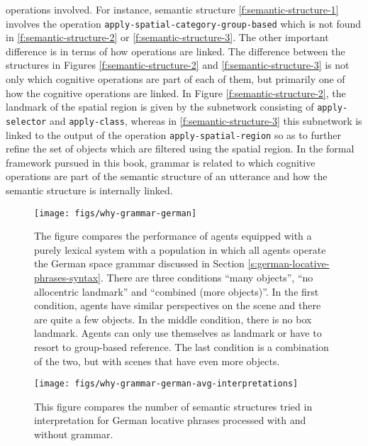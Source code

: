 operations involved. For instance, semantic structure \ref{f:semantic-structure-1}
involves the operation {\footnotesize\tt apply-spatial-category-group-based} 
which is not found in
\ref{f:semantic-structure-2} or \ref{f:semantic-structure-3}. The other 
important difference is in terms of how operations are linked. The 
difference between the structures in Figures \ref{f:semantic-structure-2}
and \ref{f:semantic-structure-3} is not only which cognitive operations 
are part of each of them, but primarily one of how the cognitive 
operations are linked. In Figure \ref{f:semantic-structure-2},
the landmark of the spatial region is given by the subnetwork consisting 
of {\footnotesize\tt apply-selector} and {\footnotesize\tt apply-class}, whereas in 
\ref{f:semantic-structure-3} this subnetwork is linked to the output of
the operation {\footnotesize\tt apply-spatial-region} so as to further refine the 
set of objects which are filtered using the spatial region. In the formal 
framework pursued in this book, grammar is related to which cognitive 
operations are part of the semantic structure of an 
utterance and how the semantic structure is internally linked.

\begin{figure}
\texttt{[image: figs/why-grammar-german]}
\caption[German locative phrases with and without grammar]{%
The figure compares
the performance of agents equipped with a purely 
lexical system with a population in 
which all agents operate the German space 
grammar discussed in Section 
\ref{s:german-locative-phrases-syntax}.
There are three conditions ``many objects'', 
``no allocentric landmark'' and 
``combined (more objects)''. In the first 
condition, agents have similar perspectives on the scene 
and there are quite a few objects. In the middle condition, there 
is no box landmark. Agents can only use 
themselves as landmark or have to resort to group-based 
reference. The last condition is a combination
of the two, but with scenes that have even more objects.}
\label{f:why-grammar-german}
\end{figure}


\begin{figure}
\begin{center}
\texttt{[image: figs/why-grammar-german-avg-interpretations]}
\end{center}
\caption[Comparison average number of interpretations]{%
This figure compares the number of semantic 
structures tried in interpretation for German locative 
phrases processed 
with and without grammar.}
\label{f:why-grammar-german-interpretation-1}
\end{figure}

